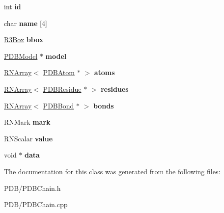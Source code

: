 \begin{DoxyCompactItemize}
\item 
int {\bfseries id}\hypertarget{class_p_d_b_chain_a1d3ebb6f3de5b7f40eb6291d67772315}{}\label{class_p_d_b_chain_a1d3ebb6f3de5b7f40eb6291d67772315}

\item 
char {\bfseries name} \mbox{[}4\mbox{]}\hypertarget{class_p_d_b_chain_af09eac0022b888b21756ebb30821d250}{}\label{class_p_d_b_chain_af09eac0022b888b21756ebb30821d250}

\item 
\hyperlink{class_r3_box}{R3\+Box} {\bfseries bbox}\hypertarget{class_p_d_b_chain_a2de2189a6488ed66eaecc0f81f0f5256}{}\label{class_p_d_b_chain_a2de2189a6488ed66eaecc0f81f0f5256}

\item 
\hyperlink{class_p_d_b_model}{P\+D\+B\+Model} $\ast$ {\bfseries model}\hypertarget{class_p_d_b_chain_aba2f5b1603a936fa00e6f034b1c9c37a}{}\label{class_p_d_b_chain_aba2f5b1603a936fa00e6f034b1c9c37a}

\item 
\hyperlink{class_r_n_array}{R\+N\+Array}$<$ \hyperlink{class_p_d_b_atom}{P\+D\+B\+Atom} $\ast$ $>$ {\bfseries atoms}\hypertarget{class_p_d_b_chain_a9e4530d4dd571eadc7d848470f35cf63}{}\label{class_p_d_b_chain_a9e4530d4dd571eadc7d848470f35cf63}

\item 
\hyperlink{class_r_n_array}{R\+N\+Array}$<$ \hyperlink{class_p_d_b_residue}{P\+D\+B\+Residue} $\ast$ $>$ {\bfseries residues}\hypertarget{class_p_d_b_chain_a0b9c608b9e5dfcf31564b4abb8435f8d}{}\label{class_p_d_b_chain_a0b9c608b9e5dfcf31564b4abb8435f8d}

\item 
\hyperlink{class_r_n_array}{R\+N\+Array}$<$ \hyperlink{class_p_d_b_bond}{P\+D\+B\+Bond} $\ast$ $>$ {\bfseries bonds}\hypertarget{class_p_d_b_chain_abd60289f2dadd911f2a1b518a0b77c4c}{}\label{class_p_d_b_chain_abd60289f2dadd911f2a1b518a0b77c4c}

\item 
R\+N\+Mark {\bfseries mark}\hypertarget{class_p_d_b_chain_a32d33aa87f9d8b1f7fd9064dc7bfbdaf}{}\label{class_p_d_b_chain_a32d33aa87f9d8b1f7fd9064dc7bfbdaf}

\item 
R\+N\+Scalar {\bfseries value}\hypertarget{class_p_d_b_chain_a86b5d5425add0866d21a7ed4390fe412}{}\label{class_p_d_b_chain_a86b5d5425add0866d21a7ed4390fe412}

\item 
void $\ast$ {\bfseries data}\hypertarget{class_p_d_b_chain_aa13b36e65a4153b18360a31b4a025dde}{}\label{class_p_d_b_chain_aa13b36e65a4153b18360a31b4a025dde}

\end{DoxyCompactItemize}


The documentation for this class was generated from the following files\+:\begin{DoxyCompactItemize}
\item 
P\+D\+B/P\+D\+B\+Chain.\+h\item 
P\+D\+B/P\+D\+B\+Chain.\+cpp\end{DoxyCompactItemize}
